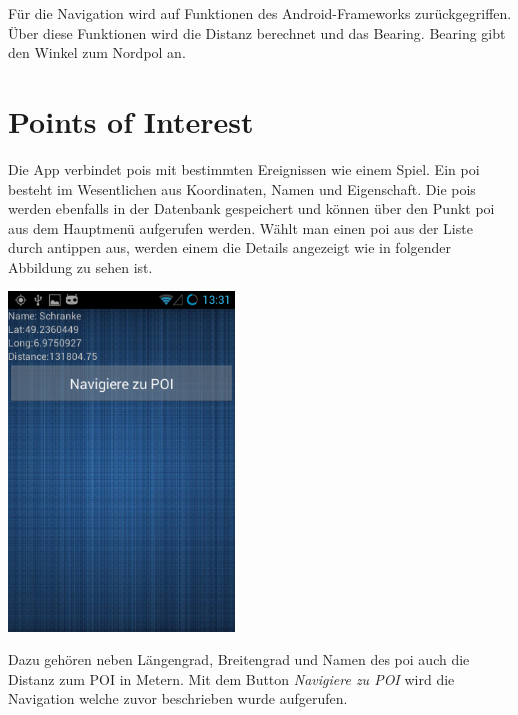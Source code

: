Für die Navigation wird auf Funktionen des Android-Frameworks zurückgegriffen. Über diese Funktionen wird die Distanz berechnet und das Bearing. Bearing gibt den Winkel zum Nordpol an.

\section{Points of Interest}
Die App verbindet \glspl{poi} mit bestimmten Ereignissen wie einem Spiel. Ein \gls{poi} besteht im Wesentlichen aus Koordinaten, Namen und Eigenschaft.  Die \glspl{poi} werden ebenfalls in der Datenbank gespeichert und können über den Punkt \gls{poi} aus dem Hauptmenü aufgerufen werden. Wählt man einen \gls{poi} aus der Liste durch antippen aus, werden einem die Details angezeigt wie in folgender Abbildung zu sehen ist.
\begin{capfigure}
	\includegraphics[width=6cm]{images/app/poidetail}
\end{capfigure}
Dazu gehören neben Längengrad, Breitengrad und Namen des \gls{poi} auch die Distanz zum POI in Metern. Mit dem Button \textit{Navigiere zu POI} wird die Navigation welche zuvor beschrieben wurde aufgerufen.

